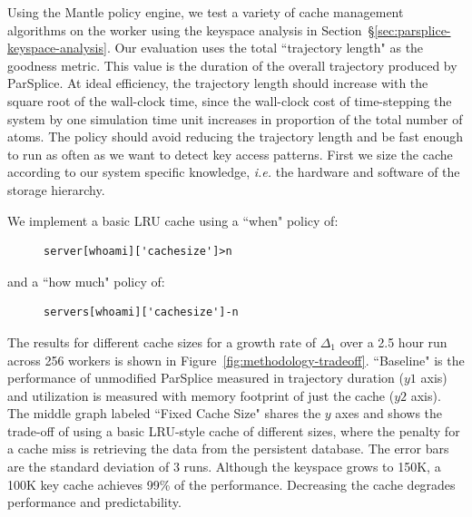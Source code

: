 Using the Mantle policy engine, we test a variety of cache management 
algorithms on the worker using the keyspace analysis in
Section~\S\ref{sec:parsplice-keyspace-analysis}.  Our evaluation uses the total
``trajectory length" as the goodness metric. This value is the duration of the
overall trajectory produced by ParSplice. At ideal efficiency, the trajectory
length should increase with the square root of the wall-clock time, since the
wall-clock cost of time-stepping the system by one simulation time unit
increases in proportion of the total number of atoms.  The policy should avoid
reducing the trajectory length and be fast enough to run as often as we want to
detect key access patterns.  First we size the cache according to our system
specific knowledge, {\it i.e.} the hardware and software of the storage
hierarchy.

We implement a basic LRU cache using a ``when" policy of:

\begin{figure}[h]
\footnotesize
\begin{verbatim}
server[whoami]['cachesize']>n
\end{verbatim}
\end{figure}

and a ``how much" policy of:

\begin{figure}[h]
\footnotesize
\begin{verbatim}
servers[whoami]['cachesize']-n
\end{verbatim}
\end{figure}

The results for different cache sizes for a growth rate of \(\Delta_1\) over a
2.5 hour run across 256 workers is shown in
Figure~\ref{fig:methodology-tradeoff}.  ``Baseline" is the performance of
unmodified ParSplice  measured in trajectory duration (\(y1\) axis) and
utilization is measured with memory footprint of just the cache (\(y2\) axis).
The middle graph labeled ``Fixed Cache Size" shares the \(y\) axes and shows
the trade-off of using a basic LRU-style cache of different sizes, where the
penalty for a cache miss is retrieving the data from the persistent database.
The error bars are the standard deviation of 3 runs.  Although the keyspace
grows to 150K, a 100K key cache achieves 99\% of the performance. Decreasing
the cache degrades performance and predictability.


